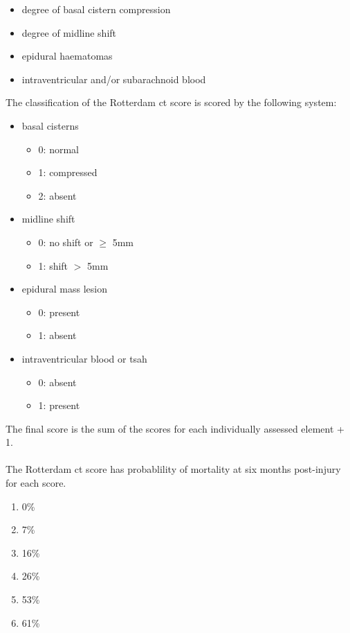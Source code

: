 \documentclass[11pt]{article}
\begin{document}
\begin{itemize}
\item{degree of basal cistern compression}
\item{degree of midline shift}
\item{epidural haematomas}
\item{intraventricular and/or subarachnoid blood}
\end{itemize}

The classification of the Rotterdam \gls{ct} score is scored by the following system:

\begin{itemize}
\item{basal cisterns}
  \begin{itemize}
    \item{0: normal}
    \item{1: compressed}
    \item{2: absent}
  \end{itemize}
\item{midline shift}
  \begin{itemize}
    \item{0: no shift or $\geq$ 5mm}
    \item{1: shift $>$ 5mm}
  \end{itemize}
\item{epidural mass lesion}
  \begin{itemize}
    \item{0: present}
    \item{1: absent}
  \end{itemize}
\item{intraventricular blood or \gls{tsah}}
  \begin{itemize}
    \item{0: absent}
    \item{1: present}
  \end{itemize}
\end{itemize}
The final score is the sum of the scores for each individually assessed element + 1.\\
\\
The Rotterdam \gls{ct} score has probablility of mortality at six months post-injury for each score.\\
\begin{enumerate}
  \item{0\%}
  \item{7\%}
  \item{16\%}
  \item{26\%}
  \item{53\%}
  \item{61\%}
\end{enumerate}
\end{document}
